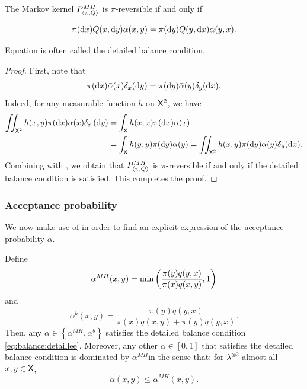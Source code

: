 \documentclass[english,graybox,envcountchap,envcountsame,sectrefs,shortlabels]{svmono}
\theoremstyle{style}
\begin{document}
\begin{lemma}
\label{lem:reversible} The Markov kernel $P_{\langle\pi,Q\rangle}^{MH}$ is $\pi$-reversible
if and only if

\begin{equation}
\pi(\mathrm{d} x)Q(x,\mathrm{d} y)\alpha(x,y)=\pi(\mathrm{d} y)Q(y,\mathrm{d} x)\alpha(y,x).\label{eq:balance:detaillee}
\end{equation}
\end{lemma}
Equation  is often called
the detailed balance condition.
\begin{proof}
First, note that
\begin{equation}
\pi(\mathrm{d} x)\bar{\alpha}(x)\delta_{x}(\mathrm{d} y)=\pi(\mathrm{d} y)\bar{\alpha}(y)\delta_{y}(\mathrm{d} x).\label{eq:balance:dirac}
\end{equation}
Indeed, for any measurable function $h$ on $\mathsf{X}^{2}$, we have
\begin{align*}
\iint_{\mathsf{X}^{2}}h(x,y)\pi(\mathrm{d} x)\bar{\alpha}(x)\delta_{x}\left(\mathrm{d} y\right) & =\int_{\mathsf{X}}h(x,x)\pi(\mathrm{d} x)\bar{\alpha}(x)\\
 & =\int_{\mathsf{X}}h(y,y)\pi(\mathrm{d} y)\bar{\alpha}(y)=\iint_{\mathsf{X}^{2}}h(x,y)\pi(\mathrm{d} y)\bar{\alpha}(y)\delta_{y}(\mathrm{d} x).
\end{align*}
Combining  with , we obtain that
$P_{\langle\pi,Q\rangle}^{MH}$ is $\pi$-reversible if and only if the detailed balance
condition  is satisfied. This completes
the proof.
\end{proof}


\subsubsection{Acceptance probability}
We now make use of  in order to find an explicit
expression of the acceptance probability $\alpha$.


\begin{lemma}
\label{lem:acceptance} Define 
$$
\alpha^{MH}(x,y)=\min\left(\frac{\pi(y)q(y,x)}{\pi(x)q(x,y)},1\right)
$$
and 
$$
\alpha^{b}(x,y)=\frac{\pi(y)q(y,x)}{\pi(x)q(x,y)+\pi(y)q(y,x)}.
$$
Then, any $\alpha\in\left\{ \alpha^{MH},\alpha^{b}\right\} $ satisfies
the detailed balance condition \eqref{eq:balance:detaillee}. Moreover, any other $\alpha\in[0,1]$
that satisfies the detailed balance condition is dominated by $\alpha^{MH}$in
the sense that: for $\lambda^{\otimes2}$-almost all $x,y\in\mathsf{X}$,
\begin{equation}
\alpha(x,y)\leq\alpha^{MH}(x,y).\label{eq:accept:max}
\end{equation}

\end{lemma}
\end{document}
